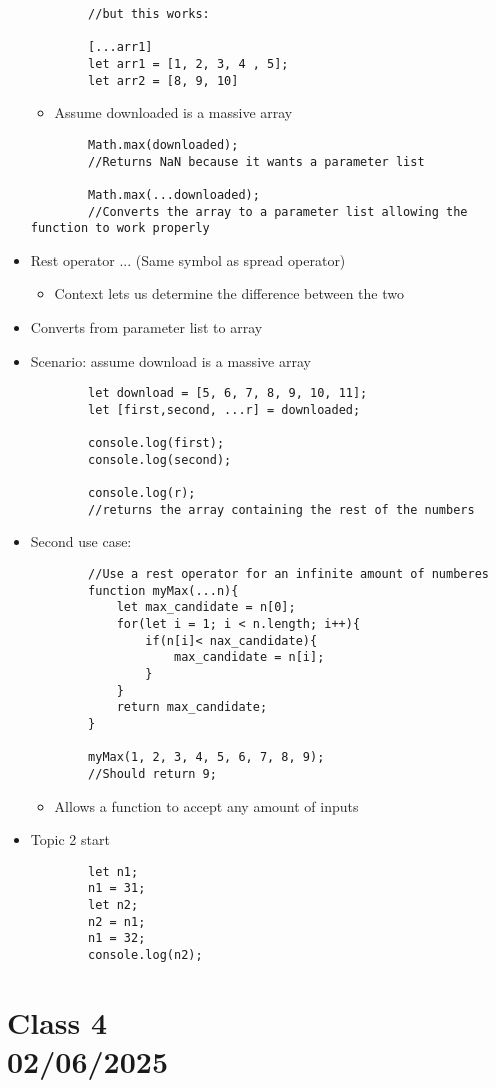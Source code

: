 \documentclass{article}
\begin{document}
\begin{itemize}
\begin{lstlisting}
        //but this works:

        [...arr1] 
        let arr1 = [1, 2, 3, 4 , 5];
        let arr2 = [8, 9, 10]
    \end{lstlisting}
    \begin{itemize}
        \item Assume downloaded is a massive array
    \end{itemize}
    \begin{lstlisting}
        Math.max(downloaded);
        //Returns NaN because it wants a parameter list

        Math.max(...downloaded);
        //Converts the array to a parameter list allowing the function to work properly
    \end{lstlisting}
    \item Rest operator ... (Same symbol as spread operator)
    \begin{itemize}
        \item Context lets us determine the difference between the two
    \end{itemize}
    \item Converts from parameter list to array
    \item Scenario: assume download is a massive array
    \begin{lstlisting}
        let download = [5, 6, 7, 8, 9, 10, 11];
        let [first,second, ...r] = downloaded;

        console.log(first);
        console.log(second);

        console.log(r);
        //returns the array containing the rest of the numbers
    \end{lstlisting}
    \item Second use case:
    \begin{lstlisting}
        //Use a rest operator for an infinite amount of numberes
        function myMax(...n){
            let max_candidate = n[0];
            for(let i = 1; i < n.length; i++){
                if(n[i]< nax_candidate){
                    max_candidate = n[i];
                }
            }
            return max_candidate;
        }

        myMax(1, 2, 3, 4, 5, 6, 7, 8, 9);
        //Should return 9;
    \end{lstlisting}
    \begin{itemize}
        \item Allows a function to accept any amount of inputs
    \end{itemize}
    \item Topic 2 start
    \begin{lstlisting}
        let n1;
        n1 = 31;
        let n2;
        n2 = n1;
        n1 = 32;
        console.log(n2);
    \end{lstlisting}
\end{itemize}

\section*{Class 4 \\ 02/06/2025}\label{sec:Class 4}
\end{document}

